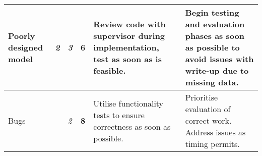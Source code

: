 \documentclass[12pt,a4,xcolor=table]{article}
\begin{document}
\begin{table}[h!]
\begin{tabular}{|>{\centering}m{1.5in} |>{\centering}m{0.1in} |>{\centering}m{0.1in} |>{\centering}m{0.3in} |>{\centering}m{1.8in} |>{\centering\arraybackslash}m{1.8in}|}
		Poorly designed model                                          & \cellcolor[HTML]{F8FF00}\textit{2}                        & \cellcolor[HTML]{FFC702}\textit{3}                        & \cellcolor[HTML]{FFC702}\textbf{6}  & Review code with supervisor during implementation, test as soon as is feasible.                                      & Begin testing and evaluation phases as soon as possible to avoid issues with write-up due to missing data.    \\ \hline
		Bugs                                                           & \cellcolor[HTML]{F88602}{\color[HTML]{333333} \textit{4}} & \cellcolor[HTML]{F8FF00}\textit{2}                        & \cellcolor[HTML]{FFC702}\textbf{8}  & Utilise functionality tests to ensure correctness as soon as possible.                                               & Prioritise evaluation of correct work. Address issues as timing permits.                                      \\ \hline	
	\end{tabular}
\end{table}
\end{document}
